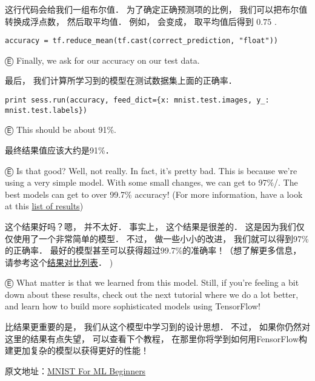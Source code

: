 这行代码会给我们一组布尔值．  为了确定正确预测项的比例， 我们可以把布尔值转换成浮点数， 然后取平均值．  例如， 会变成\li{[1,0,1,1]}， 取平均值后得到 $0.75$ .

\begin{lstlisting}
accuracy = tf.reduce_mean(tf.cast(correct_prediction, "float"))
\end{lstlisting}

Ⓔ Finally, we ask for our accuracy on our test data.

最后， 我们计算所学习到的模型在测试数据集上面的正确率．

\begin{lstlisting}
print sess.run(accuracy, feed_dict={x: mnist.test.images, y_: mnist.test.labels})
\end{lstlisting}

Ⓔ This should be about 91\%.

最终结果值应该大约是91\%．

Ⓔ Is that good? Well, not really. In fact, it's pretty bad. This is because we're using a very simple model. With some small changes, we can get to 97\%/. The best models can get to over 99.7\% accuracy! (For more information, have a look at this \href{http://rodrigob.github.io/are_we_there_yet/build/classification_datasets_results.html}{list of results})

这个结果好吗？嗯， 并不太好．  事实上， 这个结果是很差的．  这是因为我们仅仅使用了一个非常简单的模型．  不过， 做一些小小的改进， 我们就可以得到97\%的正确率．  最好的模型甚至可以获得超过99.7\%的准确率！（想了解更多信息， 请参考这个\href{http://rodrigob.github.io/are_we_there_yet/build/classification_datasets_results.html}{结果对比列表}．  )

Ⓔ What matter is that we learned from this model. Still, if you're feeling a bit down about these results, check out the next tutorial where we do a lot better, and learn how to build more sophisticated models using TensorFlow!

比结果更重要的是， 我们从这个模型中学习到的设计思想．  不过， 如果你仍然对这里的结果有点失望， 可以查看下个教程， 在那里你将学到如何用FensorFlow构建更加复杂的模型以获得更好的性能！

原文地址：\href{http://tensorflow.org/tutorials/mnist/beginners/index.md}{MNIST For ML Beginners}

